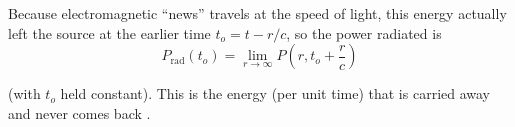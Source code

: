 \documentclass{article}
\numberwithin{equation}{section}
\begin{document}
Because electromagnetic ``news'' travels at the speed of light, this energy actually left the source at the earlier time $t_o = t - r/c$, so the power radiated is
\begin{equation*}
    P_{\text{rad}} \left( t_o \right) = \lim_{r \to \infty} P \left( r, t_o + \frac{r}{c} \right)
\end{equation*}

(with $t_o$ held constant). This is the energy (per unit time) that is carried away and never comes back \cite{griffiths}.

\printbibliography[heading=bibintoc,title={References}]

\printbibliography[heading=subbibintoc,type=book,title={Books only}]

\printbibliography[heading=subbibintoc,keyword={physics},title={Physics-related only}]
\end{document}
